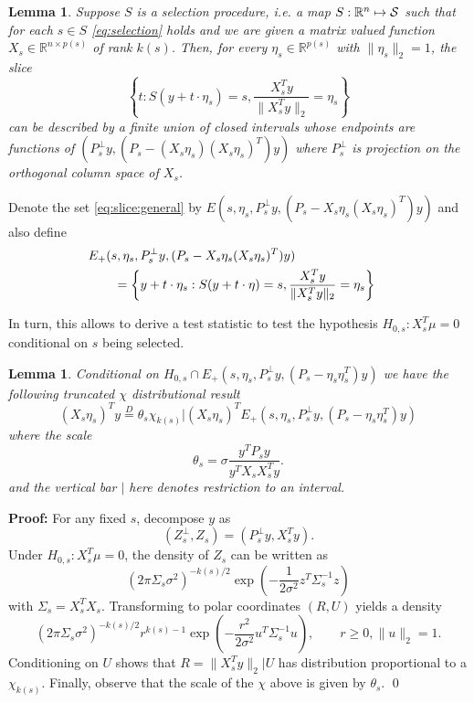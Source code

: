 \documentclass{imsart}
\newcommand{\real}{\mathbb{R}}
\newtheorem{lemma}[theorem]{Lemma}
\begin{document}
\begin{lemma}
Suppose $S$ is a selection procedure, i.e. a map $S:\real^n \mapsto {\cal S}$
such that for each $s \in S$ \eqref{eq:selection} holds 
and we are given a matrix valued function $X_s \in \real^{n \times p(s)}$ of rank
$k(s)$.
Then, for every $\eta_s \in \real^{p(s)}$ with $\|\eta_s\|_2=1$, the
slice
\begin{equation}
\label{eq:slice:general}
\left\{t: S(y+t \cdot \eta_s)=s, \frac{X_s^Ty}{\|X_s^Ty\|_2}=\eta_s \right\}
\end{equation}
can be described by
a finite union of closed intervals whose endpoints are functions of 
$(P_s^{\perp}y, (P_s- (X_s\eta_s)(X_s\eta_s)^T)y)$ where
$P_s^{\perp}$ is projection on the orthogonal column space of $X_s$.
\end{lemma}
Denote the set \eqref{eq:slice:general} by $E(s, \eta_s, P_s^{\perp}y, (P_s - X_s \eta_s(X_s\eta_s)^T)y)$ and also define
$$
\begin{aligned}
\lefteqn{
E_+(s, \eta_s, P_s^{\perp}y, (P_s - X_s \eta_s(X_s\eta_s)^T)y) } \\
 & \qquad = \left\{y + t \cdot \eta_s: S(y+t \cdot \eta)=s, \frac{X_s^Ty}{\|X_s^Ty\|_2}=\eta_s \right\} \\
\end{aligned}
$$


In turn, this allows to derive a test statistic to test the hypothesis
$H_{0,s}:X_s^T\mu=0$ conditional on $s$ being selected.
\begin{lemma}
\label{eq:test:dbn}
Conditional on $H_{0,s} \cap E_+(s, \eta_s, P_s^{\perp}y, (P_s - \eta_s\eta_s^T)y)$
we have the following truncated $\chi$ distributional result
\begin{equation}
\label{eq:chi:truncated}
(X_s\eta_s)^Ty \overset{D}{=} \theta_s \chi_{k(s)} | (X_s\eta_s)^TE_+(s, \eta_s, P_s^{\perp}y, (P_s - \eta_s\eta_s^T)y) 
\end{equation}
where the scale 
$$
\theta_s = \sigma \frac{y^TP_sy}{y^TX_sX_s^Ty}.
$$
and the vertical bar $|$ here denotes restriction to an interval.
\end{lemma}

{\bf Proof:}
For any fixed $s$, decompose $y$ as
$$
(Z^{\perp}_s,Z_s) = (P_s^{\perp}y, X_s^Ty).
$$
Under $H_{0,s}:X_s^T\mu=0$, the density of $Z_s$ can be written as
$$
(2 \pi \Sigma_s \sigma^2)^{-k(s)/2} \exp \left(-\frac{1}{2 \sigma^2} z^T\Sigma_s^{-1}z \right)
$$
with $\Sigma_s = X_s^TX_s$.
Transforming to polar coordinates $(R,U)$ yields a density
$$
(2 \pi \Sigma_s \sigma^2)^{-k(s)/2} r^{k(s)-1} \exp \left(-\frac{r^2}{2 \sigma^2} u^T\Sigma_s^{-1}u \right), \qquad r \geq 0, \|u\|_2=1.
$$
Conditioning on $U$ shows that $R=\|X_s^Ty\|_2|U$ has distribution proportional to a $\chi_{k(s)}$. Finally, observe that 
the scale of the $\chi$ above is given by $\theta_s$. \qed
\end{document}

